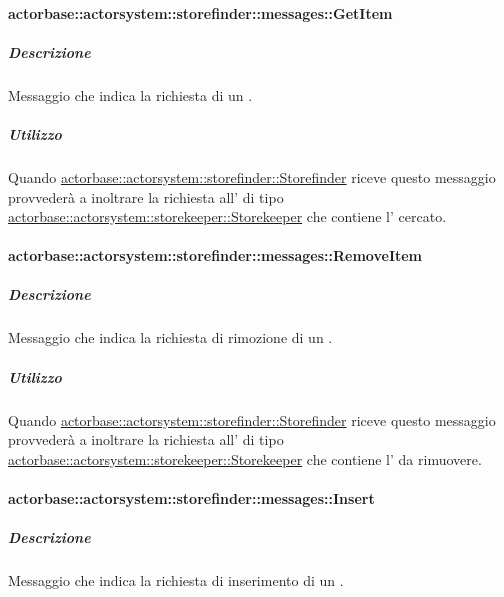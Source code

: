 \documentclass{scalatekids-article}
\begin{document}
\paragraph{actorbase::actorsystem::storefinder::messages::GetItem}
\label{sec:actorbase::actorsystem::storefinder::messages::GetItem}

\subparagraph{Descrizione}

Messaggio che indica la richiesta di un .

\subparagraph{Utilizzo}

Quando \hyperref[sec:actorbase::actorsystem::storefinder::Storefinder]{actorbase::\allowbreak{}actorsystem::\allowbreak{}storefinder::\allowbreak{}Storefinder}
riceve questo messaggio provvederà a inoltrare la richiesta all' di tipo
\hyperref[sec:actorbase::actorsystem::storekeeper::Storekeeper]{actorbase::\allowbreak{}actorsystem::\allowbreak{}storekeeper::\allowbreak{}Storekeeper}
che contiene l' cercato.

\paragraph{actorbase::actorsystem::storefinder::messages::RemoveItem}
\label{sec:actorbase::actorsystem::storefinder::messages::RemoveItem}

\subparagraph{Descrizione}

Messaggio che indica la richiesta di rimozione di un .

\subparagraph{Utilizzo}

Quando \hyperref[sec:actorbase::actorsystem::storefinder::Storefinder]{actorbase::\allowbreak{}actorsystem::\allowbreak{}storefinder::\allowbreak{}Storefinder}
riceve questo messaggio provvederà a inoltrare la richiesta all' di tipo
\hyperref[sec:actorbase::actorsystem::storekeeper::Storekeeper]{actorbase::\allowbreak{}actorsystem::\allowbreak{}storekeeper::\allowbreak{}Storekeeper}
che contiene l' da rimuovere.

\paragraph{actorbase::actorsystem::storefinder::messages::Insert}
\label{sec:actorbase::actorsystem::storefinder::messages::Insert}

\subparagraph{Descrizione}

Messaggio che indica la richiesta di inserimento di un .
\end{document}
